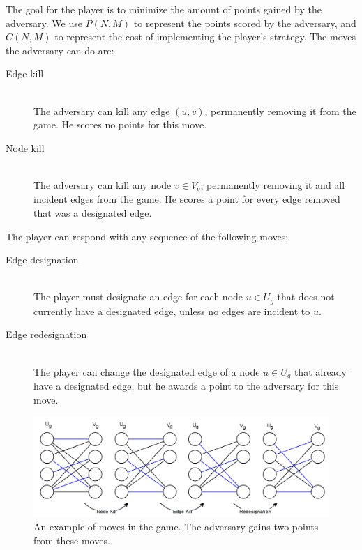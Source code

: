 The goal for the player is to minimize the amount of points gained by the adversary.
We use $P(N, M)$ to represent the points scored by the adversary, and $C(N, M)$ to represent the cost of implementing the player's strategy.
The moves the adversary can do are:
\begin{description}
  \item[Edge kill] \hfill \\
  The adversary can kill any edge $(u, v)$, permanently removing it from the game. He scores no points for this move.
  
  \item[Node kill] \hfill \\
  The adversary can kill any node $v \in V_g$, permanently removing it and all incident edges from the game. He scores a point for every edge removed that was a designated edge.
\end{description}
The player can respond with any sequence of the following moves:
\begin{description}
  \item[Edge designation] \hfill \\
  The player must designate an edge for each node $u\in U_g$ that does not currently have a designated edge,
  unless no edges are incident to $u$.
  
  \item[Edge redesignation] \hfill \\
  The player can change the designated edge of a node $u\in U_g$ that already have a designated edge, but he awards a point to the adversary for this move.
\end{description}

\begin{figure}[!ht]
\centering
\includegraphics[width=120mm]{KRGameExample.png}
\caption{An example of moves in the game. The adversary gains two points from these moves.}
\label{akExample}
\end{figure}

